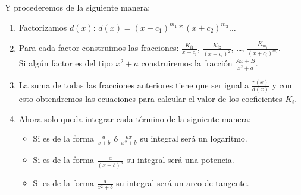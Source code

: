 \documentclass[a4paper,11pt,answers]{exam}
\begin{document}
Y procederemos de la siguiente manera:
\begin{enumerate}
	\item Factorizamos $d(x)$: $d(x) = (x+c_1) ^{m_1} *(x+ c_2)^{m_2} \dots$
	\item Para cada factor construimos las fracciones: $\frac{K_{i1}}{x+c_i}$, $\frac{K_{i2}}{(x+c_i)^2}$, \dots, $\frac{K_{m_i}}{(x+c_i)^{m_i}}$.\\
	Si algún factor es del tipo $x^2 + a$ construiremos la fracción $\frac{Ax + B}{x^2 + a}$.
	\item La suma de todas las fracciones anteriores tiene que ser igual a $\frac{r(x)}{d(x)}$ y con esto obtendremos las ecuaciones para calcular el valor de los coeficientes $K_i$.
	\item Ahora solo queda integrar cada término de la siguiente manera:
	\begin{itemize}
		\item Si es de la forma $\frac{a}{x+b}$ ó $\frac{ax}{x^2+ b}$ su integral será un logaritmo.
		\item Si es de la forma $\frac{a}{(x+b)^n}$ su integral será una potencia.
		\item Si es de la forma $\frac{a}{x^2+b}$ su integral será un arco de tangente.
	\end{itemize}
\end{enumerate}
\end{document}
